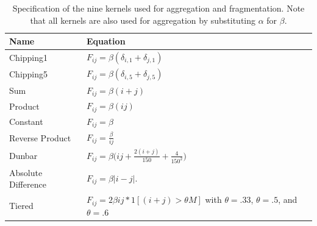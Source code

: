 \documentclass[fleqn,10pt]{wlscirep}
\begin{document}
\vspace{0.5em}
\begin{table}
    \centering
    \large
    \setlength{\tabcolsep}{12pt}
    \renewcommand{\arraystretch}{1.5}
    \begin{tabular}{ll}
        \toprule
        \textbf{Name}                      & \textbf{Equation}                                                                                                                                                 \\
        \midrule
        \rowcolor{chipping1}  Chipping1    & $F_{ij} = \beta (\delta_{i,1} + \delta_{j,1})$                                                                                                                    \\
        \rowcolor{chipping5}  Chipping5    & $F_{ij} = \beta (\delta_{i,5} + \delta_{j,5})$                                                                                                                    \\
        \rowcolor{sum}   Sum               & $F_{ij} = \beta(i + j)$                                                                                                                                           \\
        \rowcolor{product}  Product        & $F_{ij} = \beta(ij)$                                                                                                                                              \\
        \rowcolor{constant}  Constant      & $F_{ij} = \beta $                                                                                                                                                 \\
        \rowcolor{rprod}  Reverse Product  & $F_{ij} = \frac{\beta}{ij} $                                                                                                                                      \\
        \rowcolor{dunbar}  Dunbar          & $F_{ij} = \beta \big(ij + \frac{2(i + j)}{150}  + \frac{4}{150^2}\big)$                                                                                           \\
        \rowcolor{abs} Absolute Difference & $F_{ij} = \beta \lvert i - j \rvert $.                                                                                                                            \\
        Tiered                             & $ F_{ij} = 2 \beta ij * 1[(i + j) > \theta M]$ with \textcolor{tiered33}{$\theta=.33$},  \textcolor{tiered50}{$\theta=.5$}, and \textcolor{tiered60}{$\theta=.6$} \\
        \bottomrule
    \end{tabular}
    \caption{Specification of the nine kernels used for aggregation and fragmentation. Note that all kernels are also used for aggregation by substituting $ \alpha $ for $ \beta $.}
    \label{tab:kernels}
\end{table}
\end{document}
